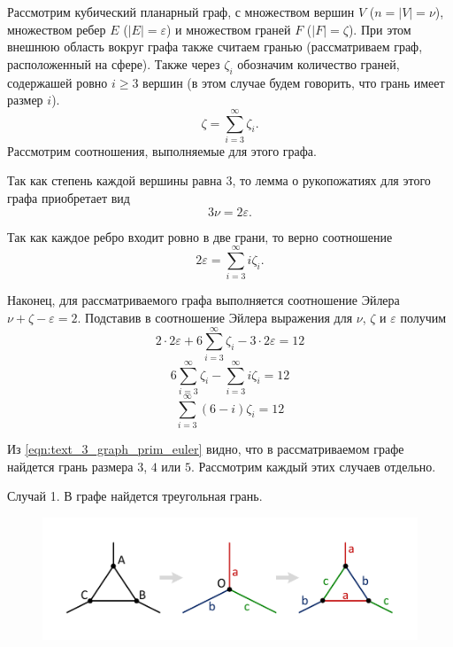 Рассмотрим кубический планарный граф, с множеством вершин $V$ ($n = |V| = \nu$), множеством ребер $E$ ($|E| = \varepsilon$) и множеством граней $F$ ($|F| = \zeta$).
При этом внешнюю область вокруг графа также считаем гранью (рассматриваем граф, расположенный на сфере).
Также через $\zeta_i$ обозначим количество граней, содержашей ровно $i \ge 3$ вершин (в этом случае будем говорить, что грань имеет размер $i$).
\begin{equation}
	\zeta = \sum_{i = 3}^{\infty}{\zeta_i}.
\end{equation}
Рассмотрим соотношения, выполняемые для этого графа.

Так как степень каждой вершины равна $3$, то лемма о рукопожатиях для этого графа приобретает вид
\begin{equation}
	3 \nu = 2 \varepsilon.
\end{equation}

Так как каждое ребро входит ровно в две грани, то верно соотношение
\begin{equation}
	2 \varepsilon = \sum_{i = 3}^{\infty}{i \zeta_i}.
\end{equation}

Наконец, для рассматриваемого графа выполняется соотношение Эйлера $\nu + \zeta - \varepsilon = 2$.
Подставив в соотношение Эйлера выражения для $\nu$, $\zeta$ и $\varepsilon$ получим
\begin{equation}
	2 \cdot 2\varepsilon + 6 \sum_{i = 3}^{\infty}{\zeta_i} - 3 \cdot 2\varepsilon = 12
\end{equation}
\begin{equation}
	6 \sum_{i = 3}^{\infty}{\zeta_i} - \sum_{i = 3}^{\infty}{i \zeta_i} = 12
\end{equation}
\begin{equation}\label{eqn:text_3_graph_prim_euler}
	\sum_{i = 3}^{\infty}{(6 - i) \zeta_i} = 12
\end{equation}

Из \eqref{eqn:text_3_graph_prim_euler} видно, что в рассматриваемом графе найдется грань размера $3$, $4$ или $5$.
Рассмотрим каждый этих случаев отдельно.

Случай 1. В графе найдется треугольная грань.

\begin{figure}[ht]
	\centering
		\includegraphics[width=1.0\textwidth]{./pics/text_3_graph_prim/coloring4_face3.pdf}
	\caption{}
	\label{fig:text_3_graph_prim_coloring4_face3}
\end{figure}

